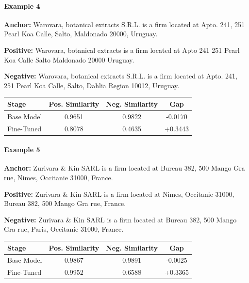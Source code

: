\documentclass{article}
\begin{document}
\paragraph{Example 4}

\textbf{Anchor:} Warovara, botanical extracts S.R.L. is a firm located at Apto. 241, 251 Pearl Koa Calle, Salto, Maldonado 20000, Uruguay.

\textbf{Positive:} Warovara, botanical extracts is a firm located at Apto 241 251 Pearl Koa Calle Salto Maldonado 20000 Uruguay.

\textbf{Negative:} Warovara, botanical extracts S.R.L. is a firm located at Apto. 241, 251 Pearl Koa Calle, Salto, Dahlia Region 10012, Uruguay.

\begin{center}
\small
\begin{tabular}{lccc}
\toprule
Stage & Pos. Similarity & Neg. Similarity & Gap \\
\midrule
Base Model & 0.9651 & 0.9822 & -0.0170 \\
Fine-Tuned & 0.8078 & 0.4635 & +0.3443 \\
\bottomrule
\end{tabular}
\end{center}

\paragraph{Example 5}

\textbf{Anchor:} Zurivara \& Kin SARL is a firm located at Bureau 382, 500 Mango Gra rue, Nimes, Occitanie 31000, France.

\textbf{Positive:} Zurivara \& Kin SARL is a firm located at Nimes, Occitanie 31000, Bureau 382, 500 Mango Gra rue, France.

\textbf{Negative:} Zurivara \& Kin SARL is a firm located at Bureau 382, 500 Mango Gra rue, Paris, Occitanie 31000, France.

\begin{center}
\small
\begin{tabular}{lccc}
\toprule
Stage & Pos. Similarity & Neg. Similarity & Gap \\
\midrule
Base Model & 0.9867 & 0.9891 & -0.0025 \\
Fine-Tuned & 0.9952 & 0.6588 & +0.3365 \\
\bottomrule
\end{tabular}
\end{center}

\end{document}
